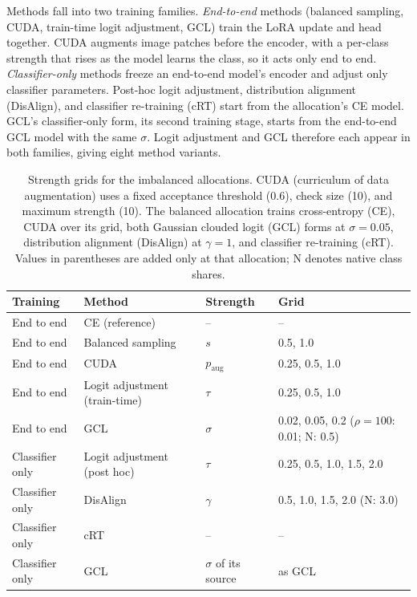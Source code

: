 \documentclass[11pt]{article}
\begin{document}
Methods fall into two training families. \emph{End-to-end} methods (balanced sampling, CUDA, train-time logit adjustment, GCL) train the LoRA update and head together. CUDA \citep{ahn2023cuda} augments image patches before the encoder, with a per-class strength that rises as the model learns the class, so it acts only end to end. \emph{Classifier-only} methods freeze an end-to-end model's encoder and adjust only classifier parameters. Post-hoc logit adjustment, distribution alignment (DisAlign), and classifier re-training (cRT) start from the allocation's CE model. GCL's classifier-only form, its second training stage, starts from the end-to-end GCL model with the same $\sigma$. Logit adjustment and GCL therefore each appear in both families, giving eight method variants.

\begin{table}[htbp]
\centering
\small
\renewcommand{\arraystretch}{1.15}
\begin{tabular}{@{}llll@{}}
\toprule
Training & Method & Strength & Grid \\
\midrule
End to end & CE (reference) & -- & -- \\
End to end & Balanced sampling & $s$ & 0.5, 1.0 \\
End to end & CUDA & $p_{\mathrm{aug}}$ & 0.25, 0.5, 1.0 \\
End to end & Logit adjustment (train-time) & $\tau$ & 0.25, 0.5, 1.0 \\
End to end & GCL & $\sigma$ & 0.02, 0.05, 0.2 ($\rho=100$: 0.01; N: 0.5) \\
Classifier only & Logit adjustment (post hoc) & $\tau$ & 0.25, 0.5, 1.0, 1.5, 2.0 \\
Classifier only & DisAlign & $\gamma$ & 0.5, 1.0, 1.5, 2.0 (N: 3.0) \\
Classifier only & cRT & -- & -- \\
Classifier only & GCL & $\sigma$ of its source & as GCL \\
\bottomrule
\end{tabular}
\caption{Strength grids for the imbalanced allocations. CUDA (curriculum of data augmentation) uses a fixed acceptance threshold (0.6), check size (10), and maximum strength (10). The balanced allocation trains cross-entropy (CE), CUDA over its grid, both Gaussian clouded logit (GCL) forms at $\sigma=0.05$, distribution alignment (DisAlign) at $\gamma=1$, and classifier re-training (cRT). Values in parentheses are added only at that allocation; N denotes native class shares.}
\label{tab:grid}
\end{table}
\end{document}
